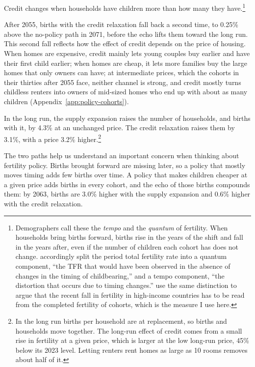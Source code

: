 Credit changes when households have children more than how many they
have.\footnote{Demographers call these the \emph{tempo} and the
\emph{quantum} of fertility. When households bring births forward, births rise
in the years of the shift and fall in the years after, even if the number of
children each cohort has does not change.
\citet{bongaartsFeeneyQuantumTempo1998} accordingly split the period
total fertility rate into a quantum component, ``the TFR that would have been
observed in the absence of changes in the timing of childbearing,'' and a
tempo component, ``the distortion that occurs due to timing changes.''
\citet{kearneyLevineWhyFertilityLow2025} use the same distinction to argue
that the recent fall in fertility in high-income countries has to be read from
the completed fertility of cohorts, which is the measure I use here.}

After 2055, births with the credit relaxation fall back a second time, to
0.25\% above the no-policy path in 2071, before the echo lifts them toward
the long run. This second fall reflects how the effect of credit depends on
the price of housing. When homes are expensive, credit mainly lets young
couples buy earlier and have their first child earlier; when homes are cheap,
it lets more families buy the large homes that only owners can have; at
intermediate prices, which the cohorts in their thirties after 2055 face,
neither channel is strong, and credit mostly turns childless renters into
owners of mid-sized homes who end up with about as many children
(Appendix~\ref{app:policy-cohorts}).

In the long run, the supply expansion raises the number of households, and
births with it, by 4.3\% at an unchanged price. The credit relaxation raises
them by 3.1\%, with a price 3.2\% higher.\footnote{In the long run births per
household are at replacement, so births and households move together. The
long-run effect of credit comes from a small rise in fertility at a given
price, which is larger at the low long-run price, 45\% below its 2023 level.
Letting renters rent homes as large as 10 rooms removes about half of it.}

The two paths help us understand an important concern when thinking about fertility policy. Births brought forward are missing later,
so a policy that mostly moves timing adds few births over time. A policy that
makes children cheaper at a given price adds births in every cohort, and the
echo of those births compounds them: by 2063, births are 3.0\% higher with the
supply expansion and 0.6\% higher with the credit relaxation.

